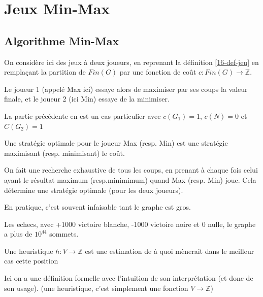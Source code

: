 \section{Jeux Min-Max}

\subsection{Algorithme Min-Max}

On considère ici des jeux à deux joueurs, en reprenant la définition \ref{16-def-jeu} en  remplaçant la partition de $Fin(G)$ par une fonction de coût $c : Fin(G) \to \mathbb Z$.

Le joueur 1 (appelé Max ici) essaye alors de maximiser par ses coups la valeur finale, et le joueur 2 (ici Min) essaye de la minimiser.

\begin{rem}
	La partie précédente en est un cas particulier avec $c(G_1) = 1$, $c(N) = 0$ et $C(G_2) = 1$ 
\end{rem}

\begin{definition}
	Une stratégie optimale pour le joueur Max (resp. Min) est une stratégie maximisant (resp. minimisant) le coût.
\end{definition}

\begin{algo}
	On fait une recherche exhaustive de tous les coups, en prenant à chaque fois celui ayant le résultat maximum (resp.minimimum) quand Max (resp. Min) joue. Cela détermine une stratégie optimale (pour les deux joueurs).
\end{algo}

\begin{rem}
	En pratique, c'est souvent infaisable tant le graphe est gros.
	\begin{example}
		Les echecs, avec +1000 victoire blanche, -1000 victoire noire et 0 nulle, le graphe a plus de $10^44$ sommets.
	\end{example}
\end{rem}

\begin{definition}
	Une heuristique $h : V \to \mathbb Z$ est une estimation de à quoi mènerait dans le meilleur cas cette position
\end{definition}

\begin{com}
	Ici on a une définition formelle avec l'intuition de son interprétation (et donc de son usage). (une heuristique, c'est simplement une fonction $V \to \mathbb Z$)
\end{com}

